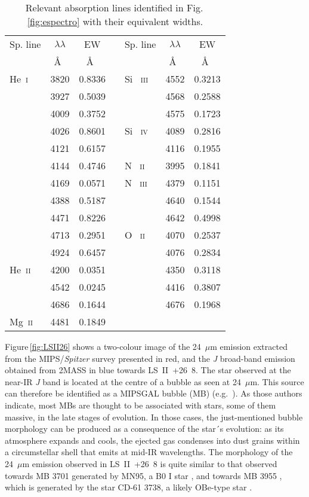 \documentclass[fleqn,usenatbib]{mnras}
\begin{document}
\begin{table}
\centering
\caption{Relevant absorption lines identified in Fig.\,\ref{fig:espectro} with their equivalent widths.}
\label{tab:eqwidth}
\begin{tabular}{l c c c l c c }
\hline
Sp. line & $\lambda\lambda$ &EW & &Sp. line & $\lambda\lambda$ &EW\\
 & \AA~ &\AA~  & & & \AA~ &\AA~\\
\hline
He~\textsc{i} & 3820 & 0.8336& &Si ~\textsc{iii} & 4552  &0.3213\\
               & 3927 & 0.5039 &&& 4568 & 0.2588 \\
               & 4009 & 0.3752&  && 4575 & 0.1723\\
		& 4026     & 0.8601 & & Si ~\textsc{iv} & 4089  &0.2816\\
		               & 4121 & 0.6157& && 4116 & 0.1955\\
		& 4144 & 0.4746 & &N ~\textsc{ii} & 3995 & 0.1841\\
                & 4169  & 0.0571 &  &N ~\textsc{iii}& 4379 & 0.1151\\
		& 4388 & 0.5187&  && 4640 & 0.1544\\ 
		& 4471 & 0.8226 & & & 4642 & 0.4998\\
		&4713 & 0.2951& &O ~\textsc{ii} & 4070 & 0.2537\\
		& 4924 & 0.6457 & && 4076 & 0.2834\\
He~\textsc{ii} & 4200 & 0.0351 &   &&  4350 & 0.3118\\
& 4542 & 0.0245  & && 4416 & 0.3807\\
&4686 & 0.1644 & 	&& 4676 & 0.1968		\\  	
Mg~\textsc{ii} & 4481 & 0.1849&&&&\\
\hline
\hline
\end{tabular}
\end{table}

Figure\,\ref{fig:LSII26} shows a two-colour image of the 24~$\mu$m emission extracted 
from the MIPS/{\it Spitzer} survey presented in red, and the {\it J} broad-band emission 
obtained from 2MASS in blue towards LS~II~+26~8. 
The star observed at the  near-IR {\it J} band is located at the centre of a bubble as 
seen at 24~$\mu$m. This source can therefore be identified as a MIPSGAL bubble (MB) (e.g.\  
\citealt{mizuno10,flag14}). As those authors indicate, most MBs are thought to be 
associated with stars, some of them massive, in the late stages of evolution. 
In those cases, the just-mentioned bubble morphology can be produced as a consequence of the star´s 
evolution: as its atmosphere expands and cools, the ejected gas condenses into dust grains 
within a circumstellar shell that emits at mid-IR wavelengths. The morphology of the 
24~$\mu$m emission observed in LS~II~+26~8 is quite similar to that observed towards 
MB 3701 generated by MN95, a \textsc{B0 I} star \citep{flag14}, and towards MB 3955 
\citep{nowak14}, which is generated by the star CD-61 3738, a likely OBe-type star \citep{steph71}.
\end{document}
